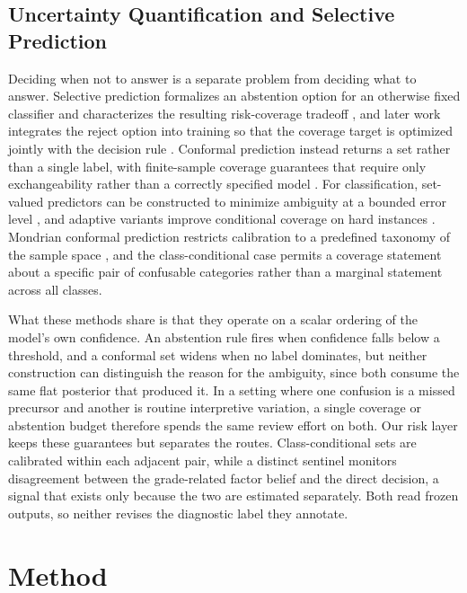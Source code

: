 \documentclass[conference]{IEEEtran}
\begin{document}
\subsection{Uncertainty Quantification and Selective Prediction}
\label{sec:rw_uncertainty}
Deciding when not to answer is a separate problem from deciding what to answer. Selective prediction formalizes an abstention option for an otherwise fixed classifier and characterizes the resulting risk-coverage tradeoff \cite{geifman2017selective}, and later work integrates the reject option into training so that the coverage target is optimized jointly with the decision rule \cite{geifman2019selectivenet}. Conformal prediction instead returns a set rather than a single label, with finite-sample coverage guarantees that require only exchangeability rather than a correctly specified model \cite{vovk2005algorithmic,angelopoulos2023conformal}. For classification, set-valued predictors can be constructed to minimize ambiguity at a bounded error level \cite{sadinle2019least}, and adaptive variants improve conditional coverage on hard instances \cite{romano2020classification}. Mondrian conformal prediction restricts calibration to a predefined taxonomy of the sample space \cite{vovk2003mondrian}, and the class-conditional case permits a coverage statement about a specific pair of confusable categories rather than a marginal statement across all classes.

What these methods share is that they operate on a scalar ordering of the model's own confidence. An abstention rule fires when confidence falls below a threshold, and a conformal set widens when no label dominates, but neither construction can distinguish the reason for the ambiguity, since both consume the same flat posterior that produced it. In a setting where one confusion is a missed precursor and another is routine interpretive variation, a single coverage or abstention budget therefore spends the same review effort on both. Our risk layer keeps these guarantees but separates the routes. Class-conditional sets are calibrated within each adjacent pair, while a distinct sentinel monitors disagreement between the grade-related factor belief and the direct decision, a signal that exists only because the two are estimated separately. Both read frozen outputs, so neither revises the diagnostic label they annotate.

\section{Method}
\label{sec:method}
\end{document}
